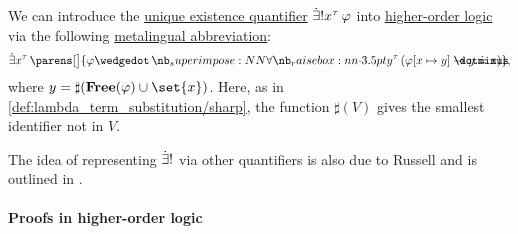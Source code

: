 \begin{remark}\label{rem:exists_unique_abbreviation}
  We can introduce the \hyperref[con:description_operator/exists_unique]{unique existence quantifier} \( \qExists {x^\tau} \varphi \) into \hyperref[def:higher_order_logic]{higher-order logic} via the following \hyperref[con:syntactic_abbreviation]{metalingual abbreviation}:
  \begin{equation}\label{eq:rem:exists_unique_abbreviation}
    \qexists {x^\tau} \parens[\big]{ \varphi \synwedge \qforall {y^\tau} (\varphi[x \mapsto y] \synimplies y \syneq x) },
  \end{equation}
  where \( y = \sharp(\op*{Free}(\varphi) \cup \set{ x }) \). Here, as in \cref{def:lambda_term_substitution/sharp}, the function \( \sharp(V) \) gives the smallest identifier not in \( V \).
\end{remark}
\begin{comments}
  \item The idea of representing \( \mathord{\dot{\exists} !} \) via other quantifiers is also due to Russell and is outlined in \cite{Russell1905OnDenoting}.
\end{comments}

\paragraph{Proofs in higher-order logic}

